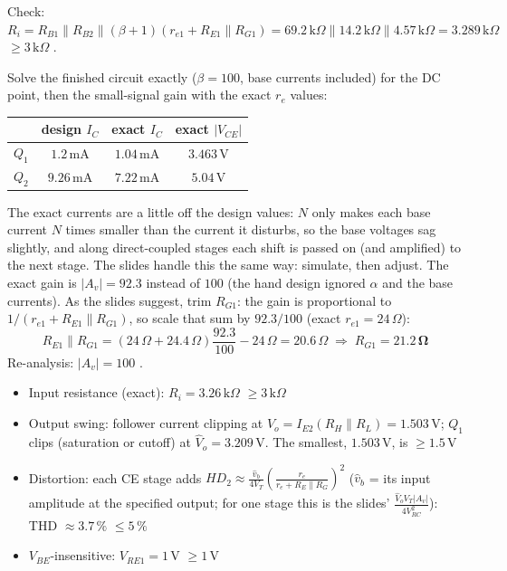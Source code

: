\documentclass[11pt]{article}
\newcommand{\solstep}[2]{\par\medskip{\color{stepc}\textbf{Step #1 --- #2}}\par\nopagebreak}
\begin{document}
Check: $R_i = R_{B1}\|R_{B2}\|(\beta+1)(r_{e1} + R_{E1}\|R_{G1}) = 69.2\,\mathrm{k}\Omega\|14.2\,\mathrm{k}\Omega\|4.57\,\mathrm{k}\Omega = 3.289\,\mathrm{k}\Omega$ $\ge 3\,\mathrm{k}\Omega$ \checkmark.
\solstep{4}{Check by analysis}Solve the finished circuit exactly ($\beta=100$, base currents included) for the DC point, then the small-signal gain with the exact $r_e$ values:\begin{center}\renewcommand{\arraystretch}{1.35}
\begin{tabular}{cccc}
\toprule
 & design $I_C$ & exact $I_C$ & exact $|V_{CE}|$ \\
\midrule
$Q_{1}$ & $1.2\,\mathrm{m}\mathrm{A}$ & $1.04\,\mathrm{m}\mathrm{A}$ & $3.463\,\mathrm{V}$ \\
$Q_{2}$ & $9.26\,\mathrm{m}\mathrm{A}$ & $7.22\,\mathrm{m}\mathrm{A}$ & $5.04\,\mathrm{V}$ \\
\bottomrule
\end{tabular}\end{center}
The exact currents are a little off the design values: $N$ only makes each base current $N$ times smaller than the current it disturbs, so the base voltages sag slightly, and along direct-coupled stages each shift is passed on (and amplified) to the next stage. The slides handle this the same way: simulate, then adjust. The exact gain is $|A_v| = 92.3$ instead of $100$ (the hand design ignored $\alpha$ and the base currents). As the slides suggest, trim $R_{G1}$: the gain is proportional to $1/(r_{e1} + R_{E1}\|R_{G1})$, so scale that sum by $92.3/100$ (exact $r_{e1} = 24\,\Omega$):\[R_{E1}\|R_{G1} = (24\,\Omega + 24.4\,\Omega)\frac{92.3}{100} - 24\,\Omega = 20.6\,\Omega \;\Rightarrow\; R_{G1} = \mathbf{21.2\,\Omega}\]Re-analysis: $|A_v| = 100$ \checkmark. \begin{itemize}[leftmargin=*,itemsep=2pt]
\item Input resistance (exact): $R_i = 3.26\,\mathrm{k}\Omega$ $\ge 3\,\mathrm{k}\Omega$ \checkmark
\item Output swing: follower current clipping at $\hat V_o = I_{E2}(R_H\|R_L) = 1.503\,\mathrm{V}$; $Q_{1}$ clips (saturation or cutoff) at $\hat V_o = 3.209\,\mathrm{V}$. The smallest, $1.503\,\mathrm{V}$, is $\ge 1.5$\,V \checkmark
\item Distortion: each CE stage adds $HD_2 \approx \frac{\hat v_b}{4V_T}\left(\frac{r_e}{r_e + R_E\|R_G}\right)^2$ ($\hat v_b$ = its input amplitude at the specified output; for one stage this is the slides' $\frac{\hat V_o V_T |A_v|}{4V_{RC}^2}$): THD $\approx 3.7\,\%$ $\le 5\,\%$ \checkmark
\item $V_{BE}$-insensitive: $V_{RE1} = 1$\,V $\ge 1$\,V \checkmark
\end{itemize}
\end{document}
